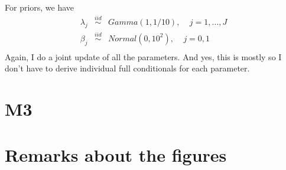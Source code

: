 \documentclass[12pt]{article}
\begin{document}
\noindent For priors, we have
\begin{eqnarray*}
\lambda_j &\overset{iid}\sim& Gamma(1, 1/10),~~~~~j=1,\ldots,J \\
\beta_j &\overset{iid}\sim& Normal(0, 10^2),~~~~~j=0,1 \\
\end{eqnarray*}
\noindent Again, I do a joint update of all the parameters. And yes, this is mostly so I don't have to derive individual full conditionals for each parameter.

\section*{M3}

\section*{Remarks about the figures}


\newpage
\end{document}
